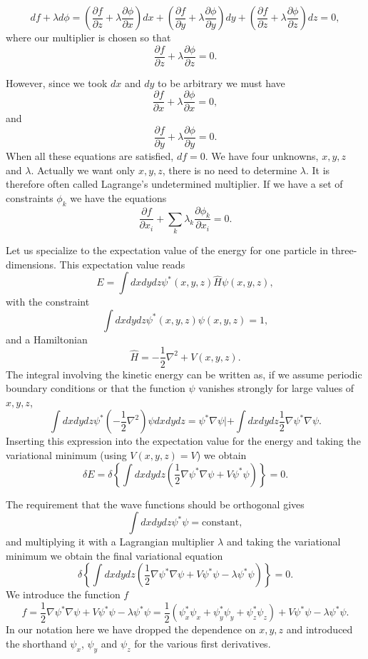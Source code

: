 \[
df+\lambda d\phi = (\frac{\partial f}{\partial z}+\lambda\frac{\partial \phi}{\partial x})dx+(\frac{\partial f}{\partial y}+\lambda\frac{\partial \phi}{\partial y})dy+
(\frac{\partial f}{\partial z}+\lambda\frac{\partial \phi}{\partial z})dz =0,
\]
where our multiplier is chosen so that
\[
\frac{\partial f}{\partial z}+\lambda\frac{\partial \phi}{\partial z} =0.
\]

However, since we took $dx$ and $dy$ to be arbitrary we must have
\[
\frac{\partial f}{\partial x}+\lambda\frac{\partial \phi}{\partial x} =0,
\]
and
\[
\frac{\partial f}{\partial y}+\lambda\frac{\partial \phi}{\partial y} =0.
\]
When all these equations are satisfied, $df=0$.  We have four unknowns, $x,y,z$ and
$\lambda$. Actually we want only $x,y,z$, there is no need to determine $\lambda$. It is therefore often called
Lagrange's undetermined multiplier. 
If we have a set of constraints $\phi_k$ we have the equations
\[
\frac{\partial f}{\partial x_i}+\sum_k\lambda_k\frac{\partial \phi_k}{\partial x_i} =0.
\]

Let us specialize to the expectation value of the energy for one particle in three-dimensions.
This expectation value reads
\[
  E=\int dxdydz \psi^*(x,y,z) \hat{H} \psi(x,y,z),
\]
with the constraint
\[
 \int dxdydz \psi^*(x,y,z) \psi(x,y,z)=1,
\]
and a Hamiltonian
\[
\hat{H}=-\frac{1}{2}\nabla^2+V(x,y,z).
\]
The integral involving the kinetic energy can be written as, if we assume periodic boundary conditions or that the function $\psi$ vanishes
strongly for large values of $x,y,z$, 
 \[
  \int dxdydz \psi^* \left(-\frac{1}{2}\nabla^2\right) \psi dxdydz = \psi^*\nabla\psi|+\int dxdydz\frac{1}{2}\nabla\psi^*\nabla\psi.
\]
Inserting this expression into the expectation value for the energy and taking the variational minimum  
(using $V(x,y,z)=V$) we obtain
\[
\delta E = \delta \left\{\int dxdydz\left( \frac{1}{2}\nabla\psi^*\nabla\psi+V\psi^*\psi\right)\right\} = 0.
\]

The requirement that the wave functions should be orthogonal gives 
\[
 \int dxdydz \psi^* \psi=\mathrm{constant},
\]
and multiplying it with a Lagrangian multiplier $\lambda$ and taking the variational minimum we obtain the final variational equation
\[
\delta \left\{\int dxdydz\left( \frac{1}{2}\nabla\psi^*\nabla\psi+V\psi^*\psi-\lambda\psi^*\psi\right)\right\} = 0.
\]
We introduce the function  $f$
\[
  f =  \frac{1}{2}\nabla\psi^*\nabla\psi+V\psi^*\psi-\lambda\psi^*\psi=
\frac{1}{2}(\psi^*_x\psi_x+\psi^*_y\psi_y+\psi^*_z\psi_z)+V\psi^*\psi-\lambda\psi^*\psi.
\]
In our notation here we have dropped the dependence on $x,y,z$ 
and introduced the shorthand $\psi_x$, $\psi_y$ and $\psi_z$  for the various first derivatives.

